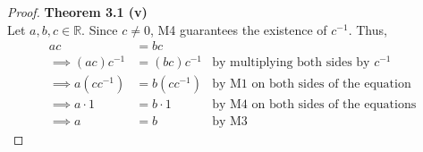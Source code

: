 \documentclass[10pt,a4paper]{article}
\theoremstyle{definition}
\begin{document}
\begin{proof}{\textbf{Theorem 3.1 (v)}}
\\Let $a,b,c \in \mathbb{R}$. Since $c \neq 0$, M4 guarantees the existence of $c^{-1}$. Thus,
\begin{align*}
ac &= bc \\
\implies (ac)c^{-1} &= (bc)c^{-1} &\text{by multiplying both sides by } c^{-1}\\
\implies a(cc^{-1}) &= b(cc^{-1}) &\text{by M1 on both sides of the equation}\\
\implies a \cdot 1 &= b \cdot 1 &\text{by M4 on both sides of the equations}\\
\implies a &= b &\text{by M3}
\end{align*}

\end{proof}
\end{document}
